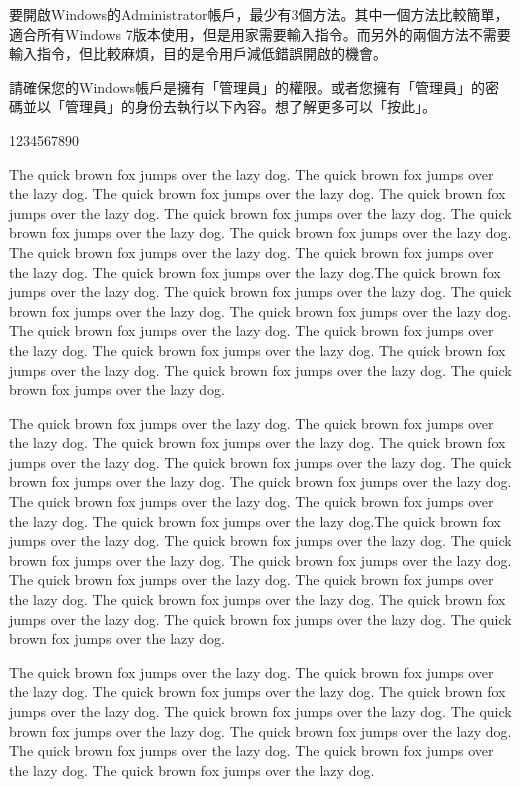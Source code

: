 \documentclass[12pt,a4paper]{article}
\begin{document}
要開啟Windows的Administrator帳戶，最少有3個方法。其中一個方法比較簡單，適合所有Windows 7版本使用，但是用家需要輸入指令。而另外的兩個方法不需要輸入指令，但比較麻煩，目的是令用戶減低錯誤開啟的機會。

請確保您的Windows帳戶是擁有「管理員」的權限。或者您擁有「管理員」的密碼並以「管理員」的身份去執行以下內容。想了解更多可以「按此」。

1234567890

The quick brown fox jumps over the lazy dog.  The quick brown fox jumps over the lazy dog.  The quick brown fox jumps over the lazy dog.  The quick brown fox jumps over the lazy dog.  The quick brown fox jumps over the lazy dog.  The quick brown fox jumps over the lazy dog.  The quick brown fox jumps over the lazy dog.  The quick brown fox jumps over the lazy dog.  The quick brown fox jumps over the lazy dog.  The quick brown fox jumps over the lazy dog.The quick brown fox jumps over the lazy dog.  The quick brown fox jumps over the lazy dog.  The quick brown fox jumps over the lazy dog.  The quick brown fox jumps over the lazy dog.  The quick brown fox jumps over the lazy dog.  The quick brown fox jumps over the lazy dog.  The quick brown fox jumps over the lazy dog.  The quick brown fox jumps over the lazy dog.  The quick brown fox jumps over the lazy dog.  The quick brown fox jumps over the lazy dog.

The quick brown fox jumps over the lazy dog.  The quick brown fox jumps over the lazy dog.  The quick brown fox jumps over the lazy dog.  The quick brown fox jumps over the lazy dog.  The quick brown fox jumps over the lazy dog.  The quick brown fox jumps over the lazy dog.  The quick brown fox jumps over the lazy dog.  The quick brown fox jumps over the lazy dog.  The quick brown fox jumps over the lazy dog.  The quick brown fox jumps over the lazy dog.The quick brown fox jumps over the lazy dog.  The quick brown fox jumps over the lazy dog.  The quick brown fox jumps over the lazy dog.  The quick brown fox jumps over the lazy dog.  The quick brown fox jumps over the lazy dog.  The quick brown fox jumps over the lazy dog.  The quick brown fox jumps over the lazy dog.  The quick brown fox jumps over the lazy dog.  The quick brown fox jumps over the lazy dog.  The quick brown fox jumps over the lazy dog.

The quick brown fox jumps over the lazy dog.  The quick brown fox jumps over the lazy dog.  The quick brown fox jumps over the lazy dog.  The quick brown fox jumps over the lazy dog.  The quick brown fox jumps over the lazy dog.  The quick brown fox jumps over the lazy dog.  The quick brown fox jumps over the lazy dog.  The quick brown fox jumps over the lazy dog.  The quick brown fox jumps over the lazy dog.  The quick brown fox jumps over the lazy dog.
\end{document}
